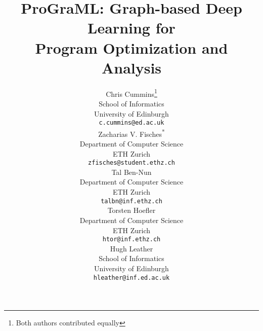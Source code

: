 \documentclass{article}
\title{ProGraML: Graph-based Deep Learning for\\Program Optimization and Analysis}
\author{%
  Chris Cummins\thanks{Both authors contributed equally}\\
  School of Informatics \\
  University of Edinburgh \\
  \texttt{c.cummins@ed.ac.uk} \\
  \And
  Zacharias V. Fisches\textsuperscript{*}\\
  Department of Computer Science \\
  ETH Zurich \\
  \texttt{zfisches@student.ethz.ch} \\
  \And
  Tal Ben-Nun \\
  Department of Computer Science \\
  ETH Zurich \\
  \texttt{talbn@inf.ethz.ch} \\
  \And
  Torsten Hoefler \\
  Department of Computer Science \\
  ETH Zurich \\
  \texttt{htor@inf.ethz.ch} \\
  \And
  Hugh Leather \\
  School of Informatics \\
  University of Edinburgh \\
  \texttt{hleather@inf.ed.ac.uk} \\
}
\begin{document}
\maketitle
\begin{abstract}

\end{abstract}













\end{document}
